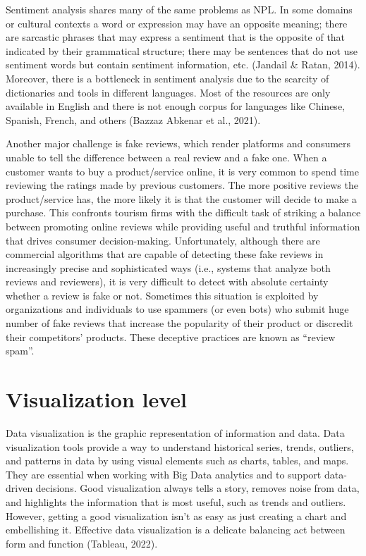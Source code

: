 \documentclass[
  letterpaper,
  DIV=11,
  numbers=noendperiod]{scrreprt}
\begin{document}
Sentiment analysis shares many of the same problems as NPL. In some
domains or cultural contexts a word or expression may have an opposite
meaning; there are sarcastic phrases that may express a sentiment that
is the opposite of that indicated by their grammatical structure; there
may be sentences that do not use sentiment words but contain sentiment
information, etc. (Jandail \& Ratan, 2014). Moreover, there is a
bottleneck in sentiment analysis due to the scarcity of dictionaries and
tools in different languages. Most of the resources are only available
in English and there is not enough corpus for languages like Chinese,
Spanish, French, and others (Bazzaz Abkenar et al., 2021).

Another major challenge is fake reviews, which render platforms and
consumers unable to tell the difference between a real review and a fake
one. When a customer wants to buy a product/service online, it is very
common to spend time reviewing the ratings made by previous customers.
The more positive reviews the product/service has, the more likely it is
that the customer will decide to make a purchase. This confronts tourism
firms with the difficult task of striking a balance between promoting
online reviews while providing useful and truthful information that
drives consumer decision-making. Unfortunately, although there are
commercial algorithms that are capable of detecting these fake reviews
in increasingly precise and sophisticated ways (i.e., systems that
analyze both reviews and reviewers), it is very difficult to detect with
absolute certainty whether a review is fake or not. Sometimes this
situation is exploited by organizations and individuals to use spammers
(or even bots) who submit huge number of fake reviews that increase the
popularity of their product or discredit their competitors' products.
These deceptive practices are known as ``review spam''.

\hypertarget{visualization-level}{%
\section{Visualization level}\label{visualization-level}}

Data visualization is the graphic representation of information and
data. Data visualization tools provide a way to understand historical
series, trends, outliers, and patterns in data by using visual elements
such as charts, tables, and maps. They are essential when working with
Big Data analytics and to support data-driven decisions. Good
visualization always tells a story, removes noise from data, and
highlights the information that is most useful, such as trends and
outliers. However, getting a good visualization isn't as easy as just
creating a chart and embellishing it. Effective data visualization is a
delicate balancing act between form and function (Tableau, 2022).
\end{document}
